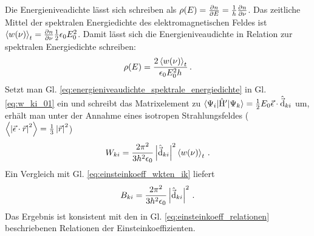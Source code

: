 Die Energieniveadichte lässt sich schreiben als
$\rho(E)=\frac{\partial n}{\partial E}=\frac{1}{h}\frac{\partial n}{\partial \nu}$.
Das zeitliche Mittel der spektralen Energiedichte des elektromagnetischen Feldes
ist $\left\langle w(\nu)\right\rangle_t=\frac{\partial n}{\partial \nu}\frac{1}{2}\epsilon_0 E^2_0$. Damit lässt
sich die Energieniveaudichte in Relation zur spektralen Energiedichte schreiben:
\begin{equation}\label{eq:energieniveaudichte_spektrale_energiedichte}
	\rho(E)=\frac{2\left\langle w(\nu)\right\rangle_t}{\epsilon_0 E_0^2h}\,.
\end{equation}
Setzt man Gl. \eqref{eq:energieniveaudichte_spektrale_energiedichte} in
Gl. \eqref{eq:w_ki_01} ein und schreibt das Matrixelement
zu $\langle{\Psi_i}|\hat{\mathrm{H}}'|{\Psi_k}\rangle =
\frac{1}{2}E_0\vec{\epsilon}\cdot\hat{\vec{\mathrm{d}}}_{ki}$ um, erhält
man unter der Annahme eines isotropen Strahlungsfeldes
($\left\langle \left|\vec{\epsilon}\cdot\vec{r}\right|^2\right\rangle = \frac{1}{3}\left|\vec{r}\right|^2$)
\begin{equation}\label{eq:w_ki_02}
	W_{ki}
	= \frac{2\pi^2}{3h^2\epsilon_0}\left|\hat{\vec{\mathrm{d}}}_{ki}\right|^2\left\langle w(\nu)\right\rangle_t\,.
\end{equation}
Ein Vergleich mit Gl. \eqref{eq:einsteinkoeff_wkten_ik} liefert
\begin{equation}\label{eq:einstein_koeff_B}
	B_{ki} = \frac{2\pi^2}{3h^2\epsilon_0}\left|\hat{\vec{\mathrm{d}}}_{ki}\right|^2\,.
\end{equation}
Das Ergebnis ist konsistent mit den in Gl.
\eqref{eq:einsteinkoeff_relationen} beschriebenen Relationen der
Einsteinkoeffizienten.


